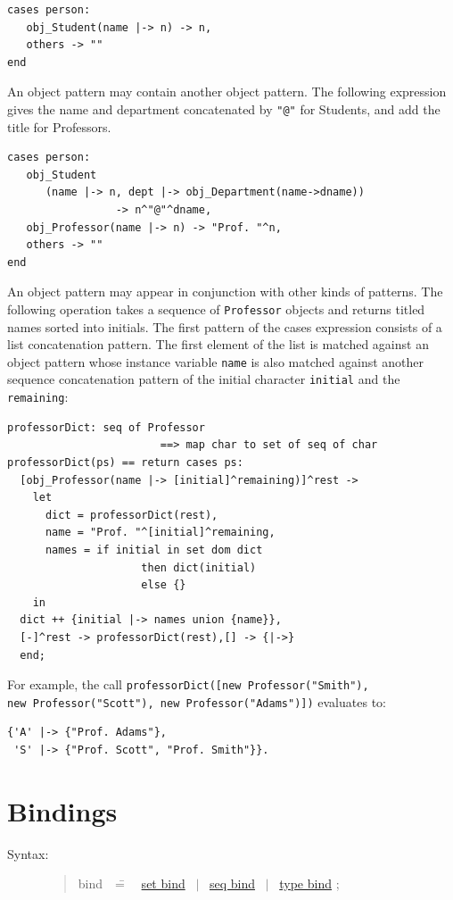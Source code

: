 \documentclass{overturerepchap}
\newcommand{\Rule}[2]{
  \begin{quote}\begin{tabbing}
    #1\index{#1}\ \ \= = \ \ \= #2  ; %

  \end{tabbing}\end{quote}
  }
\newcommand{\Ruleref}[1]{
  \hyperlink{rule:#1}{#1}}
\newcommand{\dsepl}{\ $|$\ }
\begin{document}
{\begin{description}
\begin{lstlisting}
cases person:
   obj_Student(name |-> n) -> n,
   others -> ""
end
\end{lstlisting}
An object pattern may contain another object pattern. The following expression gives the name and department concatenated by \texttt{"@"} for Students, and add the title for Professors.
\begin{lstlisting}
cases person:
   obj_Student
      (name |-> n, dept |-> obj_Department(name->dname))
                 -> n^"@"^dname,
   obj_Professor(name |-> n) -> "Prof. "^n,
   others -> ""
end
\end{lstlisting}
An object pattern may appear in conjunction with other kinds of patterns. The following operation takes a sequence of \texttt{Professor} objects and returns titled names sorted into initials. The first pattern of the cases expression consists of a list concatenation pattern. The first element of the list is matched against an object pattern whose instance variable {\tt name} is also matched against another sequence concatenation pattern of the initial character {\tt initial} and the  {\tt remaining}:

\begin{lstlisting}
professorDict: seq of Professor
                        ==> map char to set of seq of char
professorDict(ps) == return cases ps:
  [obj_Professor(name |-> [initial]^remaining)]^rest ->
    let
      dict = professorDict(rest),
      name = "Prof. "^[initial]^remaining,
      names = if initial in set dom dict
                     then dict(initial)
                     else {}
    in
  dict ++ {initial |-> names union {name}},
  [-]^rest -> professorDict(rest),[] -> {|->}
  end;
\end{lstlisting}  

For example, the call \texttt{professorDict([new Professor("Smith"), \\new Professor("Scott"), new Professor("Adams")])} evaluates to:
\begin{lstlisting}
{'A' |-> {"Prof. Adams"},
 'S' |-> {"Prof. Scott", "Prof. Smith"}}.
\end{lstlisting}


\end{description}

\chapter{Bindings}\label{bind}

\begin{description}
\item[Syntax:]
  \Rule{bind}{
    \Ruleref{set bind} \dsepl \Ruleref{seq bind} \dsepl \Ruleref{type bind}
    }


\end{description}}
\end{document}
